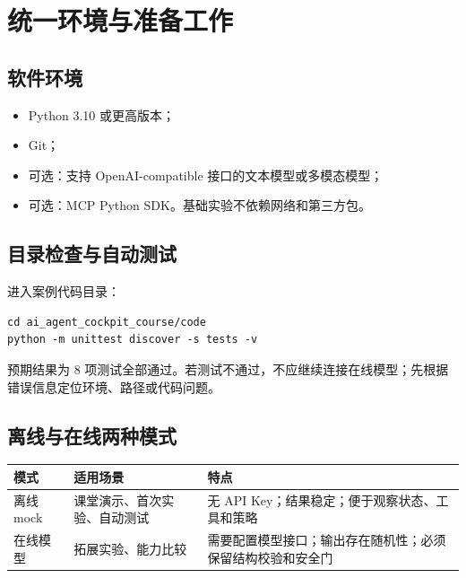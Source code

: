 \documentclass[UTF8,zihao=-4]{ctexart}
\begin{document}
\section{统一环境与准备工作}

\subsection{软件环境}

\begin{itemize}
  \item Python 3.10 或更高版本；
  \item Git；
  \item 可选：支持 OpenAI-compatible 接口的文本模型或多模态模型；
  \item 可选：MCP Python SDK。基础实验不依赖网络和第三方包。
\end{itemize}

\subsection{目录检查与自动测试}

进入案例代码目录：

\begin{lstlisting}
cd ai_agent_cockpit_course/code
python -m unittest discover -s tests -v
\end{lstlisting}

预期结果为 8 项测试全部通过。若测试不通过，不应继续连接在线模型；先根据错误信息定位环境、路径或代码问题。

\subsection{离线与在线两种模式}

\begin{table}[htbp]
\centering
\begin{tabularx}{\textwidth}{L{2.6cm} Y Y}
\toprule
模式 & 适用场景 & 特点\\
\midrule
离线 mock & 课堂演示、首次实验、自动测试 & 无 API Key；结果稳定；便于观察状态、工具和策略\\
在线模型 & 拓展实验、能力比较 & 需要配置模型接口；输出存在随机性；必须保留结构校验和安全门\\
\bottomrule
\end{tabularx}
\end{table}

\end{document}
